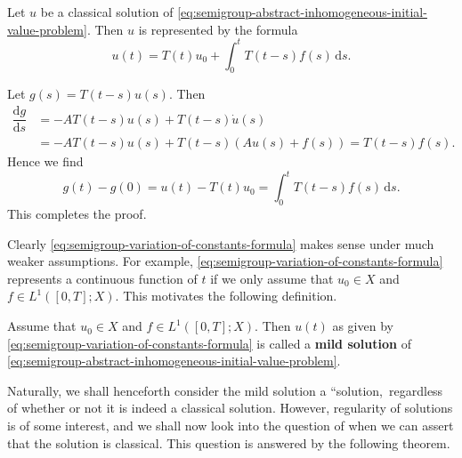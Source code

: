 \begin{Theorem}
\label{thm:semigroup-variation-of-constants}
Let $u$ be a classical solution of \eqref{eq:semigroup-abstract-inhomogeneous-initial-value-problem}. Then $u$ is represented by the formula
\begin{equation}\label{eq:semigroup-variation-of-constants-formula}
u(t)=T(t)u_0+\int_0^t T(t-s)f(s)\,\mathrm{d}s.
\end{equation}

\end{Theorem}

\begin{Proof}
Let $g(s)=T(t-s)u(s)$. Then
\begin{equation}\label{eq:semigroup-variation-of-constants-proof-derivative}
\begin{aligned}\dfrac{\mathrm{d}g}{\mathrm{d}s}&=-AT(t-s)u(s)+T(t-s)\dot u(s)\\&=-AT(t-s)u(s)+T(t-s)(Au(s)+f(s))=T(t-s)f(s).\end{aligned}
\end{equation}
Hence we find
\begin{equation}\label{eq:semigroup-variation-of-constants-proof-integral}
g(t)-g(0)=u(t)-T(t)u_0=\int_0^t T(t-s)f(s)\,\mathrm{d}s.
\end{equation}
This completes the proof.
\end{Proof}

Clearly \eqref{eq:semigroup-variation-of-constants-formula} makes sense under much weaker assumptions. For example, \eqref{eq:semigroup-variation-of-constants-formula} represents a continuous function of $t$ if we only assume that $u_0\in X$ and $f\in L^1([0,T];X)$. This motivates the following definition.

\begin{Definition}
\label{def:semigroup-mild-solution}
Assume that $u_0\in X$ and $f\in L^1([0,T];X)$. Then $u(t)$ as given by \eqref{eq:semigroup-variation-of-constants-formula} is called a \textbf{mild solution} of \eqref{eq:semigroup-abstract-inhomogeneous-initial-value-problem}.
\end{Definition}

Naturally, we shall henceforth consider the mild solution a ``solution,\textquotesingle\textquotesingle\ regardless of whether or not it is indeed a classical solution. However, regularity of solutions is of some interest, and we shall now look into the question of when we can assert that the solution is classical. This question is answered by the following theorem.

